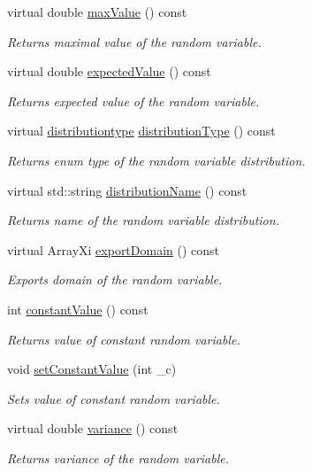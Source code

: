 \begin{DoxyCompactItemize}
virtual double \hyperlink{class_c_constant_d_r_v_a602bcf72b61be44f61c00eab0569b17e}{max\-Value} () const 
\begin{DoxyCompactList}\small\item\em Returns maximal value of the random variable. \end{DoxyCompactList}\item 
virtual double \hyperlink{class_c_constant_d_r_v_a975c37d9fd5106627cec49dcf6eea9b7}{expected\-Value} () const 
\begin{DoxyCompactList}\small\item\em Returns expected value of the random variable. \end{DoxyCompactList}\item 
virtual \hyperlink{class_c_random_variable_a80d2a87c43847274138b51f7d713d7f1}{distributiontype} \hyperlink{class_c_constant_d_r_v_a0bdcae8cb3bcbf77480aabf0ce8773e7}{distribution\-Type} () const 
\begin{DoxyCompactList}\small\item\em Returns enum type of the random variable distribution. \end{DoxyCompactList}\item 
virtual std\-::string \hyperlink{class_c_constant_d_r_v_abdd844ca2211966c00f0f9205778feec}{distribution\-Name} () const 
\begin{DoxyCompactList}\small\item\em Returns name of the random variable distribution. \end{DoxyCompactList}\item 
virtual Array\-Xi \hyperlink{class_c_constant_d_r_v_a66b319e508f2a174bf572884183aeee8}{export\-Domain} () const 
\begin{DoxyCompactList}\small\item\em Exports domain of the random variable. \end{DoxyCompactList}\item 
int \hyperlink{class_c_constant_d_r_v_a77a2209435ebee42a571f5890c3440dc}{constant\-Value} () const 
\begin{DoxyCompactList}\small\item\em Returns value of constant random variable. \end{DoxyCompactList}\item 
void \hyperlink{class_c_constant_d_r_v_afe331bab81ade39b1c26b8e6057e55a9}{set\-Constant\-Value} (int \-\_\-c)
\begin{DoxyCompactList}\small\item\em Sets value of constant random variable. \end{DoxyCompactList}\item 
virtual double \hyperlink{class_c_constant_d_r_v_a17369981ab38b3cb839cc16d596a12a6}{variance} () const 
\begin{DoxyCompactList}\small\item\em Returns variance of the random variable. \end{DoxyCompactList}\end{DoxyCompactItemize}
